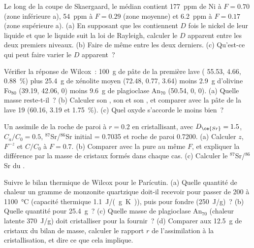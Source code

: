 \begin{exercise}[$\star\star$]\label{exo:b2:magmatic-differentiation:8}
Le long de la coupe de Skaergaard, le  médian contient \qty{177}{ppm} de Ni à
$F = 0.70$ (zone inférieure a), \qty{54}{ppm} à $F = 0.29$ (zone moyenne) et
\qty{6.2}{ppm} à $F = 0.17$ (zone supérieure a). (a) En supposant que les  contiennent
$D$ fois le nickel de leur liquide et que le liquide suit la loi de Rayleigh,
calculer le $D$ apparent entre les deux premiers niveaux.
(b) Faire de même entre les deux derniers. (c) Qu'est-ce qui peut faire varier le $D$ apparent~?
\end{exercise}

\begin{exercise}[$\star\star$]\label{exo:b2:magmatic-differentiation:9}
Vérifier la réponse de Wilcox~: \qty{100}{g} de pâte de la première lave (
55.53,  4.66,  \qty{0.88}{\percent}) plus \qty{25.4}{g} de xénolite moyen
(72.48, 0.77, 3.64) moins \qty{2.9}{g} d'olivine Fo$_{80}$ (39.19, 42.06, 0)
moins \qty{9.6}{g} de plagioclase An$_{70}$ (50.54, 0, 0). (a) Quelle masse reste-t-il~? (b) Calculer
son , son  et son , et comparer avec la pâte de la lave 19
(60.16, 3.19 et \qty{1.75}{\percent}). (c) Quel oxyde s'accorde le moins bien~?
\end{exercise}

\begin{exercise}[$\star\star\star$]\label{exo:b2:magmatic-differentiation:10}
Un  assimile de la roche de paroi à $r = 0.2$ en cristallisant, avec $D_{\ce{Sr}} =
1.5$, $C_a/C_0 = 0.5$, $^{87}$Sr/$^{86}$Sr initial = 0.7035 et roche de paroi 0.7200.
(a) Calculer $z$, $F^{-z}$ et $C/C_0$ à $F = 0.7$. (b) Comparer avec la  pure au même $F$,
et expliquer la différence par la masse de cristaux formés dans chaque cas.
(c) Calculer le $^{87}$Sr/$^{86}$Sr du .
\end{exercise}

\begin{exercise}[$\star\star\star$]\label{exo:b2:magmatic-differentiation:11}
Suivre le bilan thermique de Wilcox pour le Parícutin. (a) Quelle quantité de chaleur un gramme de monzonite
quartzique doit-il recevoir pour passer de 200 à \qty{1100}{\celsius} (capacité thermique
\qty{1.1}{J/(g.K)}), puis pour fondre (\qty{250}{J/g})~? (b) Quelle quantité pour
\qty{25.4}{g}~? (c) Quelle masse de plagioclase An$_{70}$
(chaleur latente \qty{370}{J/g}) doit cristalliser pour la fournir~?
(d) Comparer aux \qty{12.5}{g} de cristaux du bilan de masse, calculer le rapport $r$ de l'assimilation à la cristallisation,
et dire ce que cela implique.
\end{exercise}

